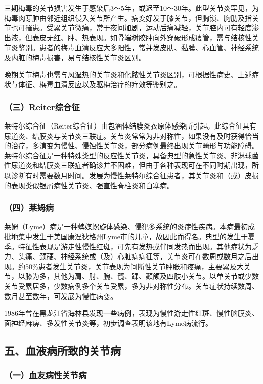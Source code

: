 三期梅毒的关节损害发生于感染后3～5年，或迟至10～30年。此型关节炎罕见，为梅毒肉芽肿由邻近组织侵入关节所产生。病变好发于膝关节，但胸锁、胸肋及指关节也可罹患。受累关节微痛，常于夜间加剧，运动后痛减轻，关节腔内可有轻度渗出液，但表皮无红、肿、热表现。如骨端树胶肿向外穿破形成瘘管，需与结核性关节炎鉴别。患者的梅毒血清反应大多阳性，常并发皮肤、黏膜、心血管、神经系统及内脏的梅毒损害，易与结核性关节炎区别。

晚期关节梅毒也需与风湿热的关节炎和化脓性关节炎区别，可根据性病史、上述症状与体征、梅毒血清反应以及驱梅治疗的疗效等鉴别之。

\subsubsection{（三）Reiter综合征}

莱特尔综合征（Reiter综合征）由包涵体结膜炎衣原体感染所引起。此综合征具有尿道炎、结膜炎与关节炎三联症。关节炎常常为非对称性，如果没有及时获得恰当的治疗，多演变为慢性、侵蚀性关节炎，部分病例最终出现关节畸形与功能障碍。莱特尔综合征是一种特殊类型的反应性关节炎，具备典型的急性关节炎、非淋球菌性尿道炎和结膜炎三联症者确诊并不困难，但由于各种表现可在不同时期出现，所以诊断有时需要数月时间。发展为慢性莱特尔综合征患者，其关节炎和（或）皮损的表现类似银屑病性关节炎、强直性脊柱炎和白塞病。

\subsubsection{（四）莱姆病}

莱姆（Lyme）病是一种蜱媒螺旋体感染、侵犯多系统的炎症性疾病。本病最初成批地集中发生于美国康涅狄格州Lyme市的儿童，故因此而得名。典型的发生于夏季。特征性表现是游走性慢性红斑，可先有发热或伴同发热而出现。其他症状为乏力、头痛、颈硬、神经系统或（及）心脏病病征等，关节炎可在数周或数月之后出现。约50\%患者发生关节炎，关节表现为间断性关节肿胀和疼痛，主要累及大关节，以膝为多，其他为肩、肘、腕、髋、踝、颞颌及四肢小关节。以单关节或少数关节受累居多，少数病例多个关节受累，多为非对称性分布。关节症状持续数周、数月甚至数年，可发展为慢性病变。

1986年曾在黑龙江省海林县发现一些病例，表现为慢性游走性红斑、慢性脑膜炎、面神经麻痹、多发性关节炎等，初步调查表明该地有Lyme病流行。

\subsection{五、血液病所致的关节病}

\subsubsection{（一）血友病性关节病}


